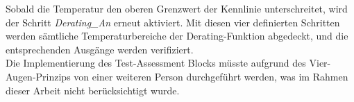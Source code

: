 Sobald die Temperatur den oberen Grenzwert der Kennlinie unterschreitet, wird der Schritt \textit{Derating\_An} erneut aktiviert. Mit diesen vier definierten Schritten werden sämtliche Temperaturbereiche der Derating-Funktion abgedeckt, und die entsprechenden Ausgänge werden verifiziert. \\
Die Implementierung des Test-Assessment Blocks müsste aufgrund des Vier-Augen-Prinzips von einer weiteren Person durchgeführt werden, was im Rahmen dieser Arbeit nicht berücksichtigt wurde.


